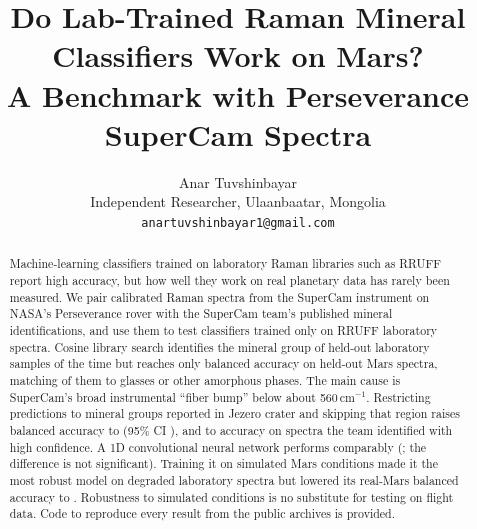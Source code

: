 \documentclass[11pt]{article}
\title{Do Lab-Trained Raman Mineral Classifiers Work on Mars?\\ A Benchmark with Perseverance SuperCam Spectra}
\author{Anar Tuvshinbayar\\ \small Independent Researcher, Ulaanbaatar, Mongolia\\ \small \texttt{anartuvshinbayar1@gmail.com}}
\date{}
\begin{document}
\maketitle

\begin{abstract}
Machine-learning classifiers trained on laboratory Raman libraries such as RRUFF report high accuracy, but how well they work on real planetary data has rarely been measured. We pair \nMarsMatched{} calibrated Raman spectra from the SuperCam instrument on NASA's Perseverance rover with the SuperCam team's published mineral identifications, and use them to test classifiers trained only on \nLabSpectra{} RRUFF laboratory spectra. Cosine library search identifies the mineral group of held-out laboratory samples \labGrpCleanCosineOpen{} of the time but reaches only \balCosineOpen{} balanced accuracy on \nMarsEval{} held-out Mars spectra, matching \fracAmorphOpen{} of them to glasses or other amorphous phases. The main cause is SuperCam's broad instrumental ``fiber bump'' below about 560\,cm$^{-1}$. Restricting predictions to mineral groups reported in Jezero crater and skipping that region raises balanced accuracy to \balCosineWindowMars{} (95\% CI \balCICosineWindowMars{}), and to \confHighCW{} accuracy on spectra the team identified with high confidence. A 1D convolutional neural network performs comparably (\balCnnCleanMars{}; the difference is not significant). Training it on simulated Mars conditions made it the most robust model on degraded laboratory spectra but lowered its real-Mars balanced accuracy to \balCnnMarsifiedMars{}. Robustness to simulated conditions is no substitute for testing on flight data. Code to reproduce every result from the public archives is provided.
\end{abstract}




\FloatBarrier







\end{document}
